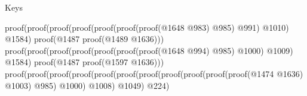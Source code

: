 \begin{lexlean}{Keys}
\begin{coremodule}
                                                                        proof(proof(proof(proof(proof(proof(proof(@1648
                                                                                        @983)
                                                                                      @985)
                                                                                    @991)
                                                                                  @1010)
                                                                                @1584)
                                                                              proof(@1487
                                                                                  proof(@1489
                                                                                      @1636)))
                                                                            proof(proof(proof(proof(proof(proof(proof(@1648
                                                                                            @994)
                                                                                          @985)
                                                                                        @1000)
                                                                                      @1009)
                                                                                    @1584)
                                                                                  proof(@1487
                                                                                      proof(@1597
                                                                                          @1636)))
                                                                                proof(proof(proof(proof(proof(proof(proof(proof(proof(proof(proof(@1474
                                                                                                        @1636)
                                                                                                      @1003)
                                                                                                    @985)
                                                                                                  @1000)
                                                                                                @1008)
                                                                                              @1049)
                                                                                            @224)

\end{coremodule}
\end{lexlean}
